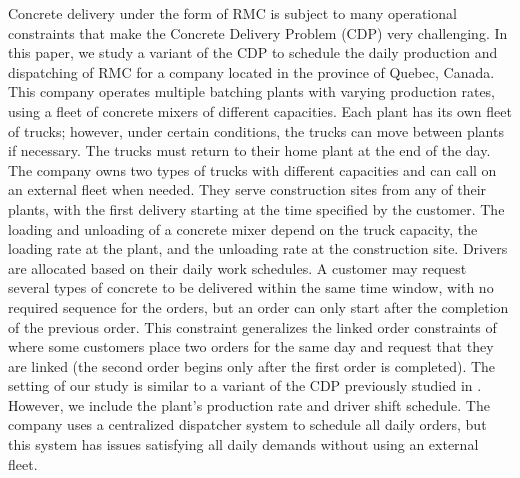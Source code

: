 \documentclass{article}
\begin{document}
Concrete delivery under the form of RMC is subject to many operational constraints that make the Concrete Delivery Problem (CDP) very challenging. In this paper, we study a variant of the CDP to schedule the daily production and dispatching of RMC for a company located in the province of Quebec, Canada. This company operates multiple batching plants with varying production rates, using a fleet of concrete mixers of different capacities. Each plant has its own fleet of trucks; however, under certain conditions, the trucks can move between plants if necessary. The trucks must return to their home plant at the end of the day. The company owns two types of trucks with different capacities and can call on an external fleet when needed. They serve construction sites from any of their plants, with the first delivery starting at the time specified by the customer. The loading and unloading of a concrete mixer depend on the truck capacity, the loading rate at the plant, and the unloading rate at the construction site. Drivers are allocated based on their daily work schedules. A customer may request several types of concrete to be delivered within the same time window, with no required sequence for the orders, but an order can only start after the completion of the previous order. This constraint generalizes the linked order constraints of \cite{durbin2008or} where some customers place two orders for the same day and request that they are linked (the second order begins only after the first order is completed). The setting of our study is similar to a variant of the CDP previously studied in \cite{schmid2009hybrid, schmid2010hybridization}. However, we include the plant's production rate and driver shift schedule. The company uses a centralized dispatcher system to schedule all daily orders, but this system has issues satisfying all daily demands without using an external fleet.
\end{document}
